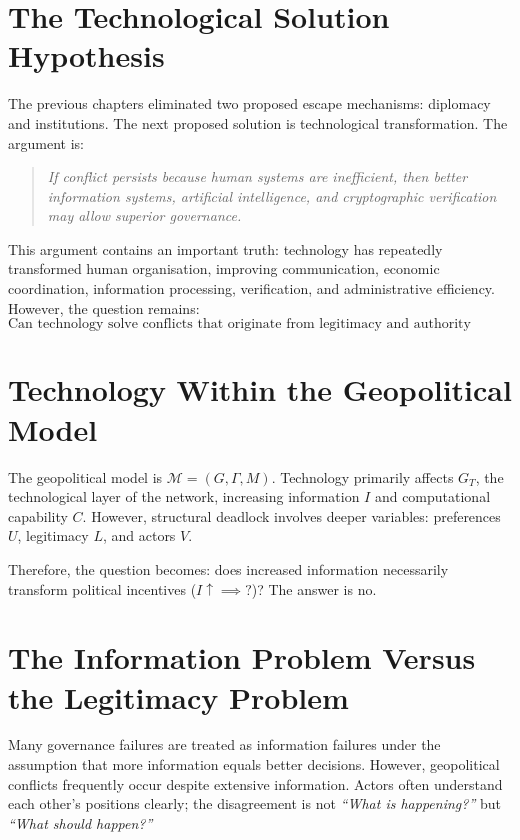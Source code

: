 \documentclass[11pt,openany]{book}
\theoremstyle{plain}
\theoremstyle{definition}
\begin{document}
\section*{The Technological Solution Hypothesis}

The previous chapters eliminated two proposed escape mechanisms: diplomacy and institutions. The next proposed solution is technological transformation. The argument is:
\begin{quote}
\textit{If conflict persists because human systems are inefficient, then better information systems, artificial intelligence, and cryptographic verification may allow superior governance.}
\end{quote}

This argument contains an important truth: technology has repeatedly transformed human organisation, improving communication, economic coordination, information processing, verification, and administrative efficiency. However, the question remains:
\[
\boxed{
\text{Can technology solve conflicts that originate from legitimacy and authority rather than information scarcity?}
}
\]

\section*{Technology Within the Geopolitical Model}

The geopolitical model is \(\mathcal{M} = (G, \Gamma, M)\). Technology primarily affects \(G_T\), the technological layer of the network, increasing information \(I\) and computational capability \(C\). However, structural deadlock involves deeper variables: preferences \(U\), legitimacy \(L\), and actors \(V\). 

Therefore, the question becomes: does increased information necessarily transform political incentives (\(I \uparrow \implies ?\))? The answer is no.

\section*{The Information Problem Versus the Legitimacy Problem}

Many governance failures are treated as information failures under the assumption that more information equals better decisions. However, geopolitical conflicts frequently occur despite extensive information. Actors often understand each other's positions clearly; the disagreement is not \textit{``What is happening?''} but \textit{``What should happen?''} 
\end{document}
